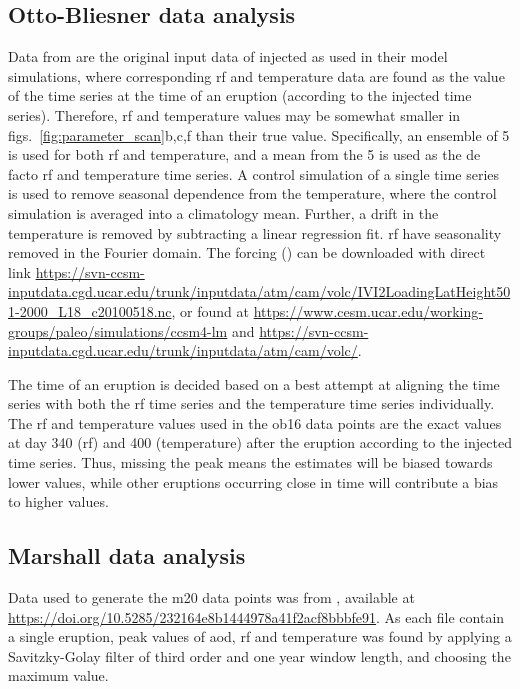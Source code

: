 \documentclass{ametsocV6.1}
\newcommand{\iso}[1][i]{{#1}njected \ce{SO2}}
\begin{document}
\appendix[B]


\subsection{Otto-Bliesner data analysis}\label{ap:ob16}

Data from \citet{ottobliesner2016} are the original input data of \iso{} as used in
their model simulations, where corresponding \gls{rf} and temperature data are found as
the value of the time series at the time of an eruption (according to the \iso{} time
series). Therefore, \gls{rf} and temperature values may be somewhat smaller in
figs.~\ref{fig:parameter_scan}b,c,f than their true value. Specifically, an ensemble of
5 is used for both \gls{rf} and temperature, and a mean from the 5 is used as the de
facto \gls{rf} and temperature time series. A control simulation of a single time series
is used to remove seasonal dependence from the temperature, where the control simulation
is averaged into a climatology mean. Further, a drift in the temperature is removed by
subtracting a linear regression fit. \gls{rf} have seasonality removed in the Fourier
domain. The forcing () can be downloaded with direct link
\url{https://svn-ccsm-inputdata.cgd.ucar.edu/trunk/inputdata/atm/cam/volc/IVI2LoadingLatHeight501-2000_L18_c20100518.nc},
or found at \url{https://www.cesm.ucar.edu/working-groups/paleo/simulations/ccsm4-lm}
and \url{https://svn-ccsm-inputdata.cgd.ucar.edu/trunk/inputdata/atm/cam/volc/}.

The time of an eruption is decided based on a best attempt at aligning the  time
series with both the \gls{rf} time series and the temperature time series individually.
The \gls{rf} and temperature values used in the \gls{ob16} data points are the exact
values at day 340 (\gls{rf}) and 400 (temperature) after the eruption according to the
\iso{} time series. Thus, missing the peak means the estimates will be biased towards
lower values, while other eruptions occurring close in time will contribute a bias to
higher values.

\subsection{Marshall data analysis}\label{ap:m20}

Data used to generate the \gls{m20} data points was from \citet{marshall2020dataset},
available at \url{https://doi.org/10.5285/232164e8b1444978a41f2acf8bbbfe91}. As each
file contain a single eruption, peak values of \gls{aod}, \gls{rf} and temperature was
found by applying a Savitzky-Golay filter of third order and one year window length, and
choosing the maximum value.
\end{document}
